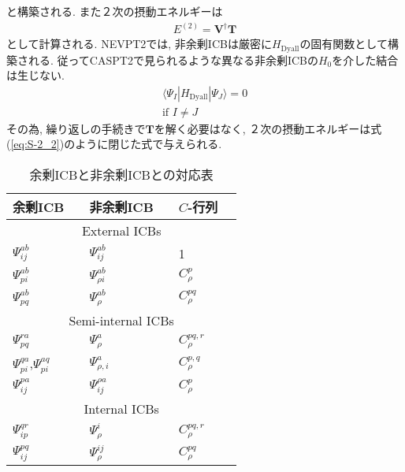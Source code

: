 \documentclass[11pt,pra,aps]{revtex4}
\begin{document}
と構築される. また２次の摂動エネルギーは
\begin{align}
  E^{(2)}=\mathbf{V}^\dagger\mathbf{T}
\end{align}
として計算される. NEVPT2では, 非余剰ICBは厳密に$H_\text{Dyall}$の固有関数として構築される. 従ってCASPT2で見られるような異なる非余剰ICBの$H_0$を介した結合は生じない. 
\begin{align}
  \langle\Psi_I|H_\text{Dyall}|\Psi_J\rangle=0 \\ \text{if }I\neq J
\end{align}
その為, 繰り返しの手続きで$\mathbf{T}$を解く必要はなく, ２次の摂動エネルギーは式(\ref{eq:S-2_2})のように閉じた式で与えられる. 

\begin{table}[h]
\caption{\label{tab:ICBs}
余剰ICBと非余剰ICBとの対応表
}
\begin{ruledtabular}
\begin{tabular}{llllll}
  余剰ICB          && 非余剰ICB        && $C$-行列 \\
  \hline
  \multicolumn{6}{c}{External ICBs} \\
  $\Psi_{ij}^{ab}$ && $\Psi_{ij}^{ab}$ && 1 \\
  $\Psi_{pi}^{ab}$ && $\Psi_{\rho i}^{ab}$ && $C_\rho^p$ \\
  $\Psi_{pq}^{ab}$ && $\Psi_{\rho}^{ab}$ && $C_\rho^{pq}$ \\
  \multicolumn{6}{c}{Semi-internal ICBs} \\
  $\Psi_{pq}^{ra}$ && $\Psi_{\rho}^{a}$ && $C_\rho^{pq,r}$ \\
  $\Psi_{pi}^{qa}$,$\Psi_{pi}^{aq}$ && $\Psi_{\rho,i}^{a}$ && $C_\rho^{p,q}$ \\
  $\Psi_{ij}^{pa}$ && $\Psi_{ij}^{\rho a}$ && $C_\rho^{p}$ \\  
  \multicolumn{6}{c}{Internal ICBs} \\
  $\Psi_{ip}^{qr}$ && $\Psi_{\rho}^{i}$ && $C_\rho^{pq,r}$ \\
  $\Psi_{ij}^{pq}$ && $\Psi_{\rho}^{ij}$ && $C_\rho^{pq}$ \\    
\end{tabular}
\end{ruledtabular}
\end{table}


\end{document}
